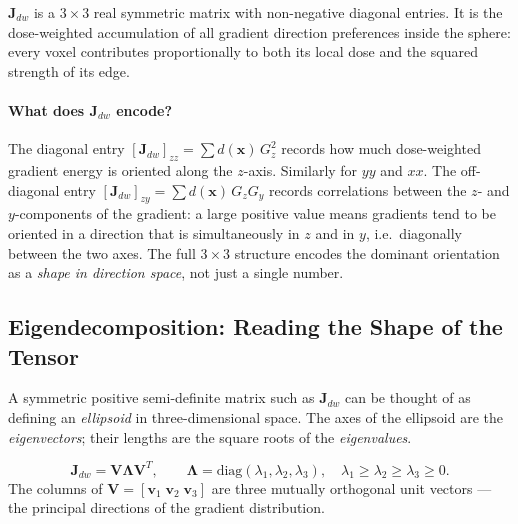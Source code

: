 \documentclass[11pt,a4paper]{article}
\newcommand{\vx}{\mathbf{x}}
\newcommand{\vv}{\mathbf{v}}
\newcommand{\vJ}{\mathbf{J}}
\newcommand{\vV}{\mathbf{V}}
\newcommand{\mLambda}{\boldsymbol{\Lambda}}
\begin{document}
$\vJ_{dw}$ is a $3\times3$ real symmetric matrix with non-negative diagonal
entries.
It is the dose-weighted accumulation of all gradient direction preferences
inside the sphere: every voxel contributes proportionally to both its local
dose and the squared strength of its edge.

\paragraph{What does $\vJ_{dw}$ encode?}
The diagonal entry $[\vJ_{dw}]_{zz} = \sum d(\vx)\,G_z^2$ records how
much dose-weighted gradient energy is oriented along the $z$-axis.
Similarly for $yy$ and $xx$.
The off-diagonal entry $[\vJ_{dw}]_{zy} = \sum d(\vx)\,G_z G_y$ records
correlations between the $z$- and $y$-components of the gradient: a large
positive value means gradients tend to be oriented in a direction that is
simultaneously in $z$ and in $y$, i.e.\ diagonally between the two axes.
The full $3\times3$ structure encodes the dominant orientation as a
\emph{shape in direction space}, not just a single number.

\subsection{Eigendecomposition: Reading the Shape of the Tensor}

A symmetric positive semi-definite matrix such as $\vJ_{dw}$ can be thought
of as defining an \emph{ellipsoid} in three-dimensional space.
The axes of the ellipsoid are the \emph{eigenvectors}; their lengths are the
square roots of the \emph{eigenvalues}.

\begin{equation}
    \vJ_{dw} = \vV\mLambda\vV^T,
    \qquad
    \mLambda = \mathrm{diag}(\lambda_1, \lambda_2, \lambda_3),
    \quad \lambda_1 \geq \lambda_2 \geq \lambda_3 \geq 0.
\end{equation}
The columns of $\vV = [\vv_1\;\vv_2\;\vv_3]$ are three mutually orthogonal
unit vectors — the principal directions of the gradient distribution.
\end{document}

